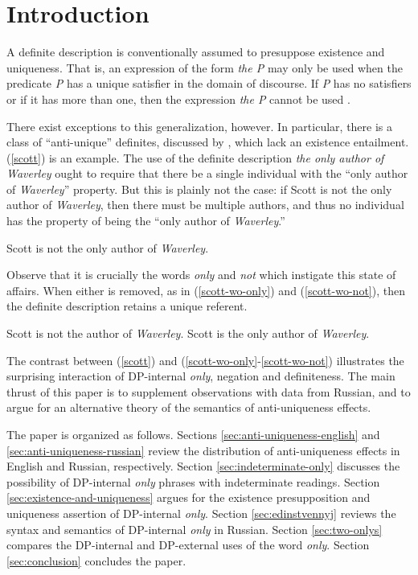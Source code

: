 \section{Introduction \label{sec:intro}}
A definite description is conventionally assumed to presuppose existence and uniqueness. That is, an expression of the form \textit{the P} may only be used when the predicate \textit{P} has a unique satisfier in the domain of discourse. If \textit{P} has no satisfiers or if it has more than one, then the expression \textit{the P} cannot be used \citep{frege, russell, horn-abbott-2012}.

There exist exceptions to this generalization, however. In particular, there is a class of ``anti-unique'' definites, discussed by \citet{cb2015}, which lack an existence entailment. (\ref{scott}) is an example. The use of the definite description \textit{the only author of Waverley} ought to require that there be a single individual with the ``only author of \textit{Waverley}'' property. But this is plainly not the case: if Scott is not the only author of \textit{Waverley}, then there must be multiple authors, and thus no individual has the property of being the ``only author of \textit{Waverley}.''

\begin{exe}
	\ex \label{scott} Scott is not the only author of \textit{Waverley}.
\end{exe}

Observe that it is crucially the words \textit{only} and \textit{not} which instigate this state of affairs. When either is removed, as in (\ref{scott-wo-only}) and (\ref{scott-wo-not}), then the definite description retains a unique referent.

\begin{exe}
	\ex \label{scott-wo-only} Scott is not the author of \textit{Waverley}.
	\ex \label{scott-wo-not} Scott is the only author of \textit{Waverley}.
\end{exe}

The contrast between (\ref{scott}) and (\ref{scott-wo-only}-\ref{scott-wo-not}) illustrates the surprising interaction of DP-internal \textit{only}, negation and definiteness. The main thrust of this paper is to supplement  observations with data from Russian, and to argue for an alternative theory of the semantics of anti-uniqueness effects.

The paper is organized as follows. Sections \ref{sec:anti-uniqueness-english} and \ref{sec:anti-uniqueness-russian} review the distribution of anti-uniqueness effects in English and Russian, respectively. Section \ref{sec:indeterminate-only} discusses the possibility of DP-internal \textit{only} phrases with indeterminate readings. Section \ref{sec:existence-and-uniqueness} argues for the existence presupposition and uniqueness assertion of DP-internal \textit{only}. Section \ref{sec:edinstvennyj} reviews the syntax and semantics of DP-internal \textit{only} in Russian. Section \ref{sec:two-onlys} compares the DP-internal and DP-external uses of the word \textit{only}. Section \ref{sec:conclusion} concludes the paper.
